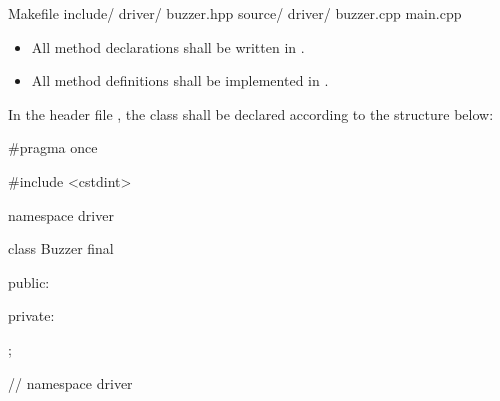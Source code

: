 \begin{console}
Makefile
include/
    driver/
        buzzer.hpp
source/
    driver/
        buzzer.cpp
    main.cpp
\end{console}

\note
\begin{itemize}
  \item All method declarations shall be written in .
  \item All method definitions shall be implemented in .
\end{itemize}

In the header file , the class shall be declared according to the structure
below:

\begin{cppcode}
#pragma once

#include <cstdint>

namespace driver
{
class Buzzer final
{
public:

private:
};
} // namespace driver
\end{cppcode}

